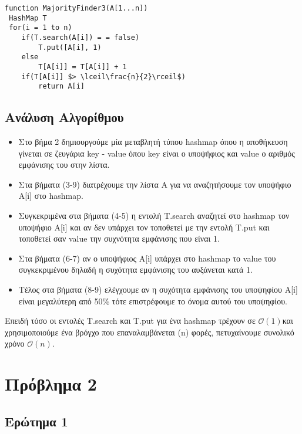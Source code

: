 \documentclass[a4paper]{article}
\begin{document}
\begin{lstlisting}[mathescape]
function MajorityFinder3(A[1...n])
 HashMap T
 for(i = 1 to n)
 	if(T.search(A[i]) = = false)
 		T.put([A[i], 1)
 	else 
 		T[A[i]] = T[A[i]] + 1
 	if(T[A[i]] $> \lceil\frac{n}{2}\rceil$)
 		return A[i]
\end{lstlisting}

\subsection*{Ανάλυση Αλγορίθμου}
\begin{itemize}
\item Στο βήμα 2 δημιουργούμε μία μεταβλητή τύπου hashmap όπου η αποθήκευση γίνεται σε ζευγάρια key - value όπου key είναι ο υποψήφιος και value ο αριθμός εμφάνισης του στην λίστα.
\item Στα βήματα (3-9) διατρέχουμε την λίστα Α για να αναζητήσουμε τον υποψήφιο Α[i] στο hashmap.
\item Συγκεκριμένα στα βήματα (4-5) η εντολή T.search αναζητεί στο hashmap τον υποψήφιο Α[i] και αν δεν υπάρχει τον τοποθετεί με την εντολή T.put και τοποθετεί σαν value την συχνότητα εμφάνισης που είναι 1.
\item Στα βήματα (6-7) αν ο υποψήφιος Α[i] υπάρχει στο hashmap το value του συγκεκριμένου δηλαδή η συχότητα εμφάνισης του αυξάνεται κατά 1.
\item Τέλος στα βήματα (8-9) ελέγχουμε αν η συχότητα εμφάνισης του υποψηφίου Α[i] είναι μεγαλύτερη από 50\% τότε επιστρέφουμε το όνομα αυτού του υποψηφίου. 
\end{itemize}
Επειδή τόσο οι εντολές T.search και Τ.put για ένα hashmap τρέχουν σε $\mathcal{O}(1)$\footnotemark[7] και χρησιμοποιούμε ένα βρόγχο που επαναλαμβάνεται (n) φορές, πετυχαίνουμε συνολικό χρόνο $\mathcal{O}(n)$.

\pagebreak
\section*{Πρόβλημα 2}
\subsection*{\color{red}Ερώτημα 1}
\end{document}
